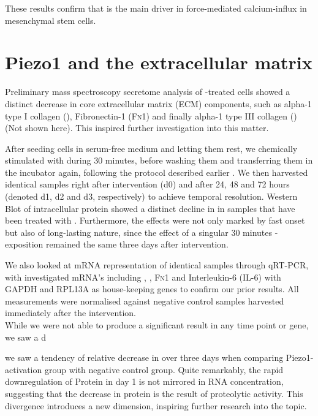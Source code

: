 
These results confirm that \Piezo{} is the main driver in force-mediated calcium-influx in mesenchymal stem cells.


\section{Piezo1 and the extracellular matrix}

Preliminary mass spectroscopy secretome analysis of \Yoda-treated cells showed a distinct decrease in core extracellular matrix (ECM) components, such as alpha-1 type I collagen (\colone), Fibronectin-1 (\textsc{Fn1}) and finally alpha-1 type III collagen (\colthree) (Not shown here).
This inspired further investigation into this matter.\par

After seeding cells in serum-free medium and letting them rest, we chemically stimulated \Piezo{} with \Yoda{} during 30 minutes, before washing them and transferring them in the incubator again, following the protocol described earlier . We then harvested identical samples right after intervention (d0) and after 24, 48 and 72 hours (denoted d1, d2 and d3, respectively) to achieve temporal resolution. Western Blot of intracellular protein showed a distinct decline in \colone in samples that have been treated with \Yoda{}.  Furthermore, the effects were not only marked by fast onset but also of long-lasting nature, since the effect of a singular 30 minutes \Yoda{}-exposition remained the same three days after intervention.\par
We also looked at mRNA representation of identical samples through qRT-PCR, with investigated mRNA's including \colone{}, \colthree{}, \textsc{Fn}1 and Interleukin-6 (IL-6) with GAPDH and RPL13A as house-keeping genes to confirm our prior results.  All measurements were normalised against negative control samples harvested immediately after the intervention.\\
While we were not able to produce a significant result in any time point or gene, we saw a d


we saw a tendency of relative decrease in \colone{} over three days when comparing Piezo1-activation group with negative control group. Quite remarkably, the rapid downregulation of Protein in day 1 is not mirrored in RNA concentration, suggesting that the decrease in protein is the result of proteolytic activity. This divergence introduces a new dimension, inspiring further research into the topic.

